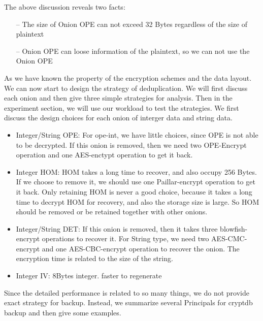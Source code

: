 The above discussion reveals two facts:

\begin{itemize}
\item[--] The size of Onion OPE can not exceed 32 Bytes regardless of the size of plaintext
\item[--] Onion OPE can loose information of the plaintext, so we can not use the Onion OPE
\end{itemize}



As we have known the property of the encryption schemes and the data layout. We can now start to design the strategy of deduplication. We will first discuss each onion and then give three simple strategies for analysis. Then in the experiment section, we will use our workload to test the strategies. We first discuss the design choices for each onion of interger data and string data. 


\begin{itemize}
\item Integer/String OPE: For ope-int, we have little choices, since OPE is not able to be decrypted. If this onion is removed, then we need two OPE-Encrypt operation and one AES-enctypt operation to get it back. 
\item Integer HOM: HOM takes a long time to recover, and also occupy 256 Bytes. If we choose to remove it, we should use one Paillar-encrypt operation to get it back. Only retaining HOM is never a good choice, because it takes a long time to decrypt HOM for recovery, and also the storage size is large. So HOM should be removed or be retained together with other onions.
\item Integer/String DET: If this onion is removed, then it takes three blowfish-encrypt operations to recover it. For String type, we need two AES-CMC-encrypt and one AES-CBC-encrypt operation to recover the onion. The encryption time is related to the size of the string.
\item Integer IV: 8Bytes integer. faster to regenerate
\end{itemize}



Since the detailed performance is related to so many things, we do not provide exact strategy for backup. Instead, we summarize several Principals for cryptdb backup and then give some examples. 

